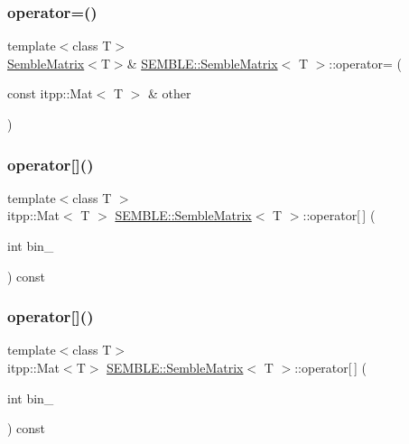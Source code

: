 \subsubsection{\texorpdfstring{operator=()}{operator=()}\hspace{0.1cm}{\footnotesize\ttfamily [4/4]}}
{\footnotesize\ttfamily template$<$class T$>$ \\
\mbox{\hyperlink{structSEMBLE_1_1SembleMatrix}{Semble\+Matrix}}$<$T$>$\& \mbox{\hyperlink{structSEMBLE_1_1SembleMatrix}{S\+E\+M\+B\+L\+E\+::\+Semble\+Matrix}}$<$ T $>$\+::operator= (\begin{DoxyParamCaption}\item[{const itpp\+::\+Mat$<$ T $>$ \&}]{other }\end{DoxyParamCaption})}

\mbox{\label{structSEMBLE_1_1SembleMatrix_adb4d8183e55a5ff64f3cf8dd6cc21d92}} 
\subsubsection{\texorpdfstring{operator[]()}{operator[]()}\hspace{0.1cm}{\footnotesize\ttfamily [1/4]}}
{\footnotesize\ttfamily template$<$class T $>$ \\
itpp\+::\+Mat$<$ T $>$ \mbox{\hyperlink{structSEMBLE_1_1SembleMatrix}{S\+E\+M\+B\+L\+E\+::\+Semble\+Matrix}}$<$ T $>$\+::operator\mbox{[}$\,$\mbox{]} (\begin{DoxyParamCaption}\item[{int}]{bin\+\_\+ }\end{DoxyParamCaption}) const}

\mbox{\label{structSEMBLE_1_1SembleMatrix_aa94e51e73d150167c5ad97d4c8291add}} 
\subsubsection{\texorpdfstring{operator[]()}{operator[]()}\hspace{0.1cm}{\footnotesize\ttfamily [2/4]}}
{\footnotesize\ttfamily template$<$class T$>$ \\
itpp\+::\+Mat$<$T$>$ \mbox{\hyperlink{structSEMBLE_1_1SembleMatrix}{S\+E\+M\+B\+L\+E\+::\+Semble\+Matrix}}$<$ T $>$\+::operator\mbox{[}$\,$\mbox{]} (\begin{DoxyParamCaption}\item[{int}]{bin\+\_\+ }\end{DoxyParamCaption}) const}

